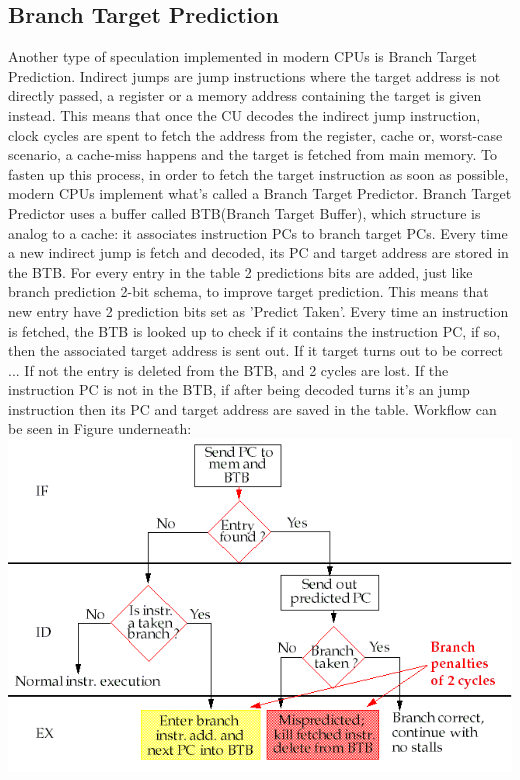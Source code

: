 \subsection{Branch Target Prediction}
Another type of speculation implemented in modern CPUs is Branch Target Prediction.
Indirect jumps are jump instructions where the target address is not directly passed, a register or a memory address containing the target is given instead.
This means that once the CU decodes the indirect jump instruction, clock cycles are spent to fetch the address from the register, cache or, worst-case scenario, a cache-miss happens and the target is fetched from main memory.
To fasten up this process, in order to fetch the target instruction as soon as possible, modern CPUs implement what's called a Branch Target Predictor.
Branch Target Predictor uses a buffer called BTB(Branch Target Buffer), which structure is analog to a cache: it associates instruction PCs to branch target PCs. Every time a new indirect jump is fetch and decoded, its PC and target address are stored in the BTB.
For every entry in the table 2 predictions bits are added, just like branch prediction 2-bit schema, to improve target prediction.
This means that new entry have 2 prediction bits set as 'Predict Taken'.
Every time an instruction is fetched, the BTB is looked up to check if it contains the instruction PC, if so, then the associated target address is sent out.
If it target turns out to be correct ...
If not the entry is deleted from the BTB, and 2 cycles are lost.
If the instruction PC is not in the BTB, if after being decoded turns it's an jump instruction then its PC and target address are saved in the table.
Workflow can be seen in Figure underneath:
\includegraphics[scale=0.35]{img/BTB.png}
